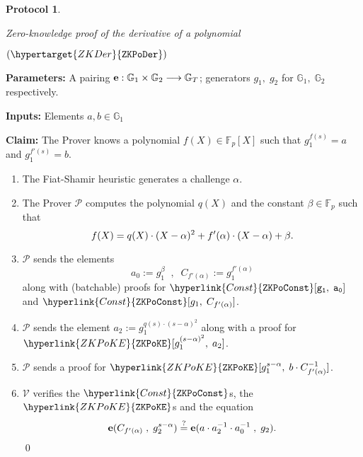 \documentclass[11pt, lettersize, notitlepage, leqno, footskip=0.6cm]{article}
\newcommand{\bFp}{\mathbb{F}_p}
\newcommand{\lra}{\longrightarrow}
\newcommand{\mc}{\mathcal}
\newcommand{\mb}{\mathbb}
\newcommand{\mbf}{\mathbf}
\newcommand{\al}{\alpha}
\newcommand{\be}{\beta}
\newcommand{\mP}{\mc{P}}
\newcommand{\V}{\mc{V}}
\newcommand{\vs}{\vspace{-0.15cm}}
\newcommand{\noin}{\noindent}
\newcommand{\sta}{\stackrel{?}{=}}
\newcommand{\e}{\mbf{e}}
\newtheorem{Prot}[Thm]{Protocol}
\numberwithin{equation}{section}
\begin{document}
\begin{mdframed}
\begin{Prot} \hypertarget{ZKDer}{Zero-knowledge proof of the  derivative of a polynomial} $(\hypertarget{ZKDer}{\tt{ZKPoDer}})$\end{Prot}  

\noin \textbf{Parameters:} A pairing ${\bf{e}}:\mb{G}_1\times \mb{G}_2\lra \mb{G}_T$; generators $g_1,\;g_2$ for $\mb{G}_1,\; \mb{G}_2$ respectively.


\noindent \textbf{Inputs:} Elements $a,b\in \mb{G}_1$

\noindent \textbf{Claim:} The Prover knows a polynomial $f(X)\in \bFp[X]$ such that $g_1^{f(s)} = a$ and $g_1^{f'(s)} = b$. 

\begin{enumerate}[wide, labelwidth=!, labelindent=0pt, itemsep=-0.2ex]

\item The Fiat-Shamir heuristic generates a challenge $\al$.

\item The Prover $\mP$ computes the polynomial $q(X)$ and the constant $\be \in \bFp$ such that \vs $$ f(X) =  q(X)\cdot (X-\al)^2 + f'(\al)\cdot (X-\al) + \be. \vs $$ 

\item $\mP$ sends the elements \vs $$a_0:= g_1^{\be}\;\;,\;\; C_{f'(\al)}:= g_1^{f'(\al)} $$ along with (batchable) proofs for $\hyperlink{Const}{\tt{ZKPoConst}}[g_1,\; a_0]$ and $\hyperlink{Const}{\tt{ZKPoConst}}[g_1,\; C_{f'(\al)}]$.

\item $\mP$ sends the element $a_2:= g_1^{q(s)\cdot(s-\al)^2}$ along with a proof for $\hyperlink{ZKPoKE}{\tt{ZKPoKE}}[g_1^{(s-\al)^2},\; a_2]$.

\item $\mP$ sends a proof for $\hyperlink{ZKPoKE}{\tt{ZKPoKE}}[g_1^{s-\al},\; b\cdot C_{f'(\al)}^{-1}]$.


\item $\V$ verifies the $\hyperlink{Const}{\tt{ZKPoConst}}$s, the $\hyperlink{ZKPoKE}{\tt{ZKPoKE}}$s and the equation \vs $$ \e(C_{f'(\al)}\;,\;g_2^{s-\al})\sta \e(a\cdot a_2^{-1}\cdot a_0^{-1}\;,\;g_2) .\vspace{-8mm}$$ \qed \vspace{2mm} \end{enumerate} \end{mdframed}
\end{document}
